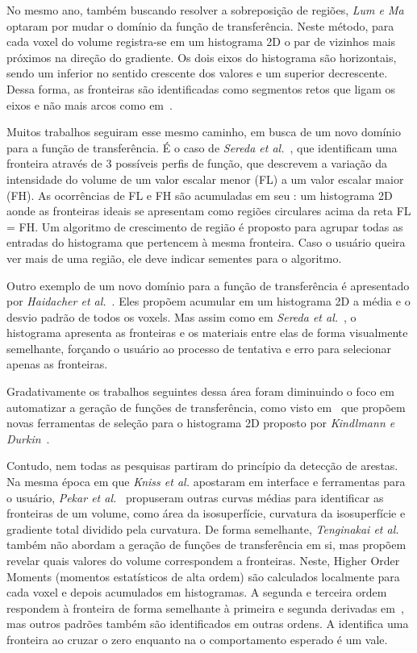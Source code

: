 	No mesmo ano, também buscando resolver a sobreposição de regiões, \textit{Lum e Ma}~\cite{lumema} optaram por mudar o domínio da função de transferência. Neste método, para cada voxel do volume registra-se em um histograma 2D o par de vizinhos mais próximos na direção do gradiente. Os dois eixos do histograma são horizontais, sendo um inferior no sentido crescente dos valores e um superior decrescente. Dessa forma, as fronteiras são identificadas como segmentos retos que ligam os eixos e não mais arcos como em~\cite{gordon}.
	
	Muitos trabalhos seguiram esse mesmo caminho, em busca de um novo domínio para a função de transferência. É o caso de \textit{Sereda et al.}~\cite{sereda1}, que identificam uma fronteira através de 3 possíveis perfis de função, que descrevem a variação da intensidade do volume de um valor escalar menor (FL) a um valor escalar maior (FH). As ocorrências de FL e FH são acumuladas em seu : um histograma 2D aonde as fronteiras ideais se apresentam como regiões circulares acima da reta FL = FH. Um algoritmo de crescimento de região é proposto para agrupar todas as entradas do histograma que pertencem à mesma fronteira. Caso o usuário queira ver mais de uma região, ele deve indicar sementes para o algoritmo.
	
	Outro exemplo de um novo domínio para a função de transferência é apresentado por \textit{Haidacher et al.}~\cite{haidacher}. Eles propõem acumular em um histograma 2D a média e o desvio padrão de todos os voxels. Mas assim como em \textit{Sereda et al.}~\cite{sereda1}, o histograma apresenta as fronteiras e os materiais entre elas de forma visualmente semelhante, forçando o usuário ao processo de tentativa e erro para selecionar apenas as fronteiras.
	
	Gradativamente os trabalhos seguintes dessa área foram diminuindo o foco em automatizar a geração de funções de transferência, como visto em~\cite{zou, wang} que propõem novas ferramentas de seleção para o histograma 2D proposto por \textit{Kindlmann e Durkin}~\cite{gordon}.
	
	Contudo, nem todas as pesquisas partiram do princípio da detecção de arestas. Na mesma época em que \textit{Kniss et al.} apostaram em interface e ferramentas para o usuário, \textit{Pekar et al.}~\cite{pekar} propuseram outras curvas médias para identificar as fronteiras de um volume, como área da isosuperfície, curvatura da isosuperfície e gradiente total dividido pela curvatura. De forma semelhante, \textit{Tenginakai et al.}~\cite{salient} também não abordam a geração de funções de transferência em si, mas propõem revelar quais valores do volume correspondem a fronteiras. Neste, Higher Order Moments (momentos estatísticos de alta ordem) são calculados localmente para cada voxel e depois acumulados em histogramas. A segunda e terceira ordem respondem à fronteira de forma semelhante à primeira e segunda derivadas em~\cite{gordon}, mas outros padrões também são identificados em outras ordens. A  identifica uma fronteira ao cruzar o zero enquanto na  o comportamento esperado é um vale.
	
